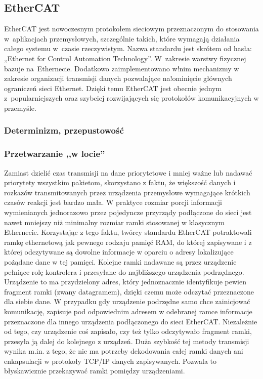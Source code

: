 \subsection{EtherCAT}
EtherCAT jest nowoczesnym protokołem sieciowym przeznaczonym do stosowania w~aplikacjach przemysłowych, szczególnie takich, które wymagają działania całego systemu w~czasie rzeczywistym. Nazwa standardu jest skrótem od hasła: „Ethernet for Control Automation Technology”. W~zakresie warstwy fizycznej bazuje na~Ethernecie. Dodatkowo zaimplementowano w!nim mechanizmy w zakresie organizacji transmisji danych pozwalające na!ominięcie głównych ograniczeń sieci Ethernet. Dzięki temu EtherCAT jest obecnie jednym z~popularniejszych oraz szybciej rozwijających się protokołów komunikacyjnych w przemyśle.

\subsubsection{Determinizm, przepustowość}

\subsubsection{Przetwarzanie ,,w locie''}
Zamiast dzielić czas transmisji na dane priorytetowe i mniej ważne lub nadawać priorytety wszystkim pakietom, skorzystano z faktu, że większość danych i rozkazów transmitowanych przez urządzenia przemysłowe wymagające krótkich czasów reakcji jest bardzo mała. W praktyce rozmiar porcji informacji wymienianych jednorazowo przez pojedyncze przyrządy podłączone do sieci jest nawet mniejszy niż minimalny rozmiar ramki stosowanej w klasycznym Ethernecie. Korzystając z tego faktu, twórcy standardu EtherCAT potraktowali ramkę ethernetową jak pewnego rodzaju pamięć RAM, do której zapisywane i z której odczytywane są dowolne informacje w oparciu o adresy lokalizujące pożądane dane w tej pamięci.
Kolejne ramki nadawane są przez urządzenie pełniące rolę kontrolera i przesyłane do najbliższego urządzenia podrzędnego. Urządzenie to ma przydzielony adres, który jednoznacznie identyfikuje pewien fragment ramki (zwany datagramem), dzięki czemu może odczytać przeznaczone dla siebie dane. W przypadku gdy urządzenie podrzędne samo chce zainicjować komunikację, zapisuje pod odpowiednim adresem w odebranej ramce informacje przeznaczone dla innego urządzenia podłączonego do sieci EtherCAT. Niezależnie od tego, czy urządzenie coś zapisało, czy też tylko odczytywało fragment ramki, przesyła ją dalej do kolejnego z urządzeń. Duża szybkość tej metody transmisji wynika m.in. z tego, że nie ma potrzeby dekodowania całej ramki danych ani enkapsulacji w protokoły TCP/IP danych zapisywanych. Pozwala to błyskawicznie przekazywać ramki pomiędzy urządzeniami.

